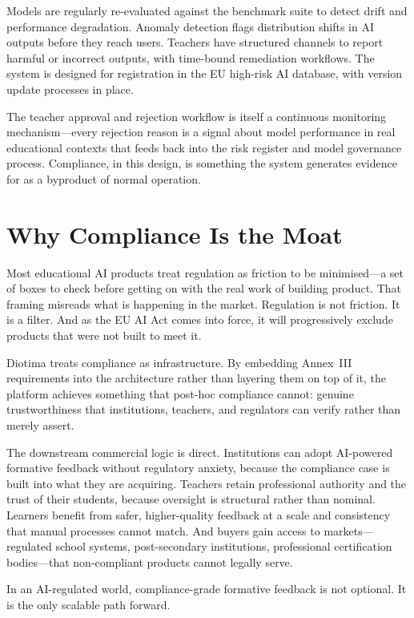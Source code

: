 \documentclass[10pt, a4paper, twocolumn]{article}
\begin{document}
Models are regularly re-evaluated against the benchmark suite to detect drift and
performance degradation. Anomaly detection flags distribution shifts in AI outputs
before they reach users. Teachers have structured channels to report harmful or
incorrect outputs, with time-bound remediation workflows. The system is designed for
registration in the EU high-risk AI database, with version update processes in place.

The teacher approval and rejection workflow is itself a continuous monitoring
mechanism---every rejection reason is a signal about model performance in real
educational contexts that feeds back into the risk register and model governance
process. Compliance, in this design, is something the system generates evidence for
as a byproduct of normal operation.

\section{Why Compliance Is the Moat}

Most educational AI products treat regulation as friction to be minimised---a set of
boxes to check before getting on with the real work of building product. That framing
misreads what is happening in the market. Regulation is not friction. It is a filter.
And as the EU AI Act comes into force, it will progressively exclude products that were
not built to meet it.

Diotima treats compliance as infrastructure. By embedding Annex~III requirements into
the architecture rather than layering them on top of it, the platform achieves something
that post-hoc compliance cannot: genuine trustworthiness that institutions, teachers,
and regulators can verify rather than merely assert.

The downstream commercial logic is direct. Institutions can adopt AI-powered formative
feedback without regulatory anxiety, because the compliance case is built into what they
are acquiring. Teachers retain professional authority and the trust of their students,
because oversight is structural rather than nominal. Learners benefit from safer,
higher-quality feedback at a scale and consistency that manual processes cannot match.
And buyers gain access to markets---regulated school systems, post-secondary
institutions, professional certification bodies---that non-compliant products cannot
legally serve.

In an AI-regulated world, compliance-grade formative feedback is not optional. It is
the only scalable path forward.
\end{document}
